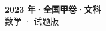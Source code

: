 \documentclass[zihao=-4, a4paper]{ctexart}
\begin{document}
\begin{center}
  {\Large\bfseries 2023 年·全国甲卷·文科}\\[4pt]
  {\large 数学 · 试题版}
\end{center}
\medskip
{}

\end{document}
